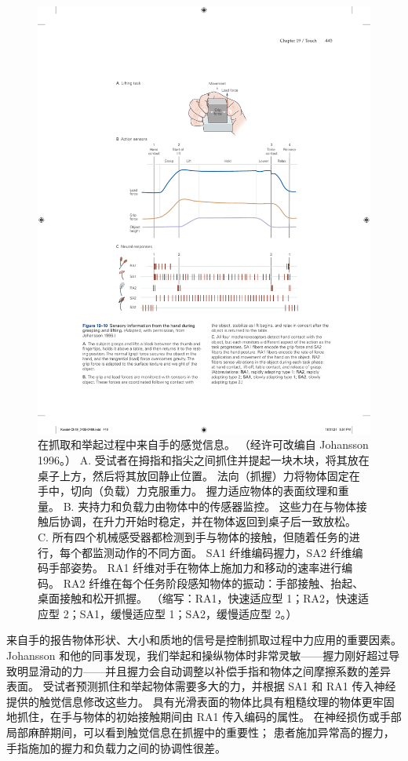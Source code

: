\begin{figure}[htbp]
	\centering
	\includegraphics[width=1.0\linewidth]{chap19/fig_19_10}
	\caption{在抓取和举起过程中来自手的感觉信息。 （经许可改编自 Johansson 1996。） 
		A. 受试者在拇指和指尖之间抓住并提起一块木块，将其放在桌子上方，然后将其放回静止位置。 
		法向（抓握）力将物体固定在手中，切向（负载）力克服重力。 
		握力适应物体的表面纹理和重量。 
		B. 夹持力和负载力由物体中的传感器监控。 
		这些力在与物体接触后协调，在升力开始时稳定，并在物体返回到桌子后一致放松。 
		C. 所有四个机械感受器都检测到手与物体的接触，但随着任务的进行，每个都监测动作的不同方面。 
		SA1 纤维编码握力，SA2 纤维编码手部姿势。 
		RA1 纤维对手在物体上施加力和移动的速率进行编码。 
		RA2 纤维在每个任务阶段感知物体的振动：手部接触、抬起、桌面接触和松开抓握。 （缩写：RA1，快速适应型 1；RA2，快速适应型 2；SA1，缓慢适应型 1；SA2，缓慢适应型 2。）}
	\label{fig:19_10}
\end{figure}


来自手的报告物体形状、大小和质地的信号是控制抓取过程中力应用的重要因素。 
Johansson 和他的同事发现，我们举起和操纵物体时非常灵敏——握力刚好超过导致明显滑动的力——并且握力会自动调整以补偿手指和物体之间摩擦系数的差异 表面。 
受试者预测抓住和举起物体需要多大的力，并根据 SA1 和 RA1 传入神经提供的触觉信息修改这些力。 
具有光滑表面的物体比具有粗糙纹理的物体更牢固地抓住，在手与物体的初始接触期间由 RA1 传入编码的属性。 
在神经损伤或手部局部麻醉期间，可以看到触觉信息在抓握中的重要性； 患者施加异常高的握力，手指施加的握力和负载力之间的协调性很差。


